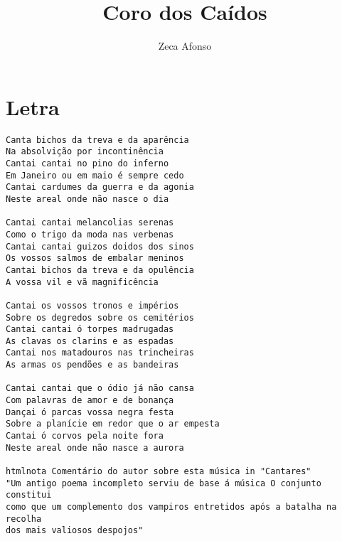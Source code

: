 \documentclass{article}
\author{Zeca Afonso}
\title{Coro dos Caídos}
\begin{document}
\maketitle
\section{Letra}
\begin{verbatim}
Canta bichos da treva e da aparência
Na absolvição por incontinência
Cantai cantai no pino do inferno
Em Janeiro ou em maio é sempre cedo
Cantai cardumes da guerra e da agonia
Neste areal onde não nasce o dia

Cantai cantai melancolias serenas
Como o trigo da moda nas verbenas
Cantai cantai guizos doidos dos sinos
Os vossos salmos de embalar meninos
Cantai bichos da treva e da opulência
A vossa vil e vã magnificência

Cantai os vossos tronos e impérios
Sobre os degredos sobre os cemitérios
Cantai cantai ó torpes madrugadas
As clavas os clarins e as espadas
Cantai nos matadouros nas trincheiras
As armas os pendões e as bandeiras

Cantai cantai que o ódio já não cansa
Com palavras de amor e de bonança
Dançai ó parcas vossa negra festa
Sobre a planície em redor que o ar empesta
Cantai ó corvos pela noite fora
Neste areal onde não nasce a aurora

htmlnota Comentário do autor sobre esta música in "Cantares"
"Um antigo poema incompleto serviu de base á música O conjunto constitui
como que um complemento dos vampiros entretidos após a batalha na recolha
dos mais valiosos despojos"

\end{verbatim}
\end{document}

